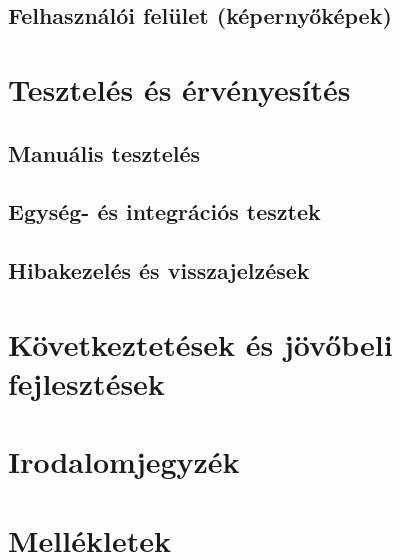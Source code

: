 \subsection{Felhasználói felület (képernyőképek)}

\section{Tesztelés és érvényesítés}

\subsection{Manuális tesztelés}
\subsection{Egység- és integrációs tesztek}
\subsection{Hibakezelés és visszajelzések}

\section{Következtetések és jövőbeli fejlesztések}

\section*{Irodalomjegyzék}

\section*{Mellékletek}

